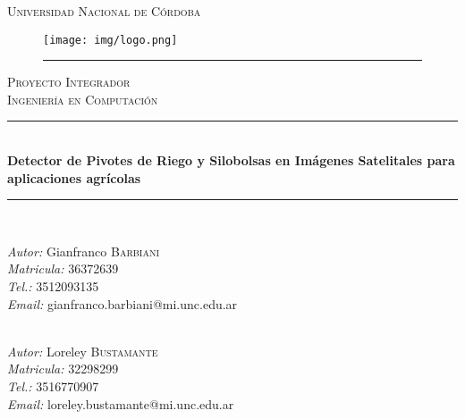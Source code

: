 \documentclass[runningheads]{llncs}
\begin{document}
\frontmatter %
\newcommand{\HRule}{\rule{\linewidth}{0.5mm}} %


\begin{titlepage}
\begin{center}
\textsc{\LARGE Universidad Nacional de Córdoba}\\ %

\begin{figure}[htbp]
	\centering
		\texttt{[image: img/logo.png]}
		\rule{35em}{0.5pt}
\end{figure}

\textsc{\Large Proyecto Integrador}\\[0.5cm] %
\textsc{\Large Ingeniería en Computación}\\[0.5cm] %

\HRule \\[0.4cm] %
{\LARGE \bfseries Detector de Pivotes de Riego y Silobolsas en Imágenes Satelitales para aplicaciones agrícolas
}\\[0.2cm] %
\HRule \\[0.5cm] %

\begin{minipage}{0.49\textwidth}
\begin{flushleft} \large
\emph{Autor: }{Gianfranco \textsc{Barbiani}}\\
\emph{Matricula: }{36372639}\\
\emph{Tel.: }{3512093135}\\
\emph{Email: }{gianfranco.barbiani@mi.unc.edu.ar}\\~\\
\end{flushleft}
\end{minipage}
\begin{minipage}{0.49\textwidth}
\begin{flushleft} \large
\emph{Autor: }{Loreley \textsc{Bustamante}}\\
\emph{Matricula: }{32298299}\\
\emph{Tel.: }{3516770907}\\
\emph{Email: }{loreley.bustamante@mi.unc.edu.ar}\\~\\
\end{flushleft}
\end{minipage}


\end{center}
\end{titlepage}
\end{document}
